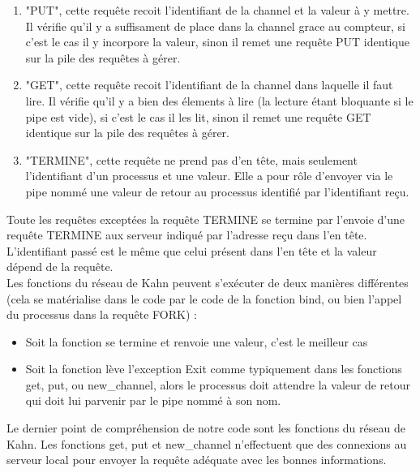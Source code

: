 \documentclass[a4paper, 12pt, twoside]{report}
\begin{document}
\begin{itemize}
\begin{enumerate}
          \item "PUT", cette requête recoit l'identifiant de la channel et la valeur à y mettre. Il vérifie qu'il y a suffisament 
                de place dans la channel grace au compteur, si c'est le cas il y incorpore la valeur, sinon il remet une requête 
                PUT identique sur la pile des requêtes à gérer.
          \item "GET", cette requête recoit l'identifiant de la channel dans laquelle il faut lire. Il vérifie qu'il y a bien 
                des élements à lire (la lecture étant bloquante si le pipe est vide), si c'est le cas il les lit, sinon 
                il remet une requête GET identique sur la pile des requêtes à gérer.
          \item "TERMINE", cette requête ne prend pas d'en tête, mais seulement l'identifiant d'un processus et une valeur. 
                Elle a pour rôle d'envoyer via le pipe nommé une valeur de retour au processus identifié par l'identifiant reçu.\\
        \end{enumerate}
\end{itemize}

Toute les requêtes exceptées la requête TERMINE se termine par l'envoie d'une requête TERMINE aux serveur indiqué par l'adresse 
reçu dans l'en tête. L'identifiant passé est le même que celui présent dans l'en tête et la valeur dépend de la requête.\\

Les fonctions du réseau de Kahn peuvent s'exécuter de deux manières différentes (cela se matérialise dans le code par le code 
de la fonction bind, ou bien l'appel du processus dans la requête FORK) :
\begin{itemize}
  \item Soit la fonction se termine et renvoie une valeur, c'est le meilleur cas
  \item Soit la fonction lève l'exception Exit comme typiquement dans les fonctions get, put, ou new\_channel, alors 
        le processus doit attendre la valeur de retour qui doit lui parvenir par le pipe nommé à son nom.\\
\end{itemize}

Le dernier point de compréhension de notre code sont les fonctions du réseau de Kahn. Les fonctions get, put et new\_channel 
n'effectuent que des connexions au serveur local pour envoyer la requête adéquate avec les bonnes informations.\\
\end{document}
